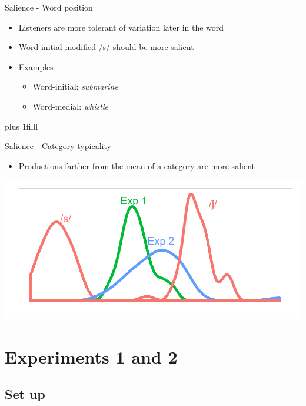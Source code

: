 \documentclass{beamer}
\newcommand{\btVFill}{\vskip0pt plus 1filll}
\begin{document}
\begin{frame}{Salience - Word position}

\begin{itemize}
\item Listeners are more tolerant of variation later in the word
\item Word-initial modified /s/ should be more salient
\item Examples
\begin{itemize}
\item Word-initial: \emph{submarine}
\item Word-medial: \emph{whistle}
\end{itemize}
\end{itemize}
\btVFill
\begin{flushright}
\scriptsize
\citet{Pitt2012}
\end{flushright}
\end{frame}

\begin{frame}{Salience - Category typicality}

\begin{itemize}
\item Productions farther from the mean of a category are more salient
\end{itemize}

\includegraphics[width=1.0\textwidth]{graphs/salience}
\end{frame}

\section{Experiments 1 and 2}

\subsection{Set up}
\end{document}
